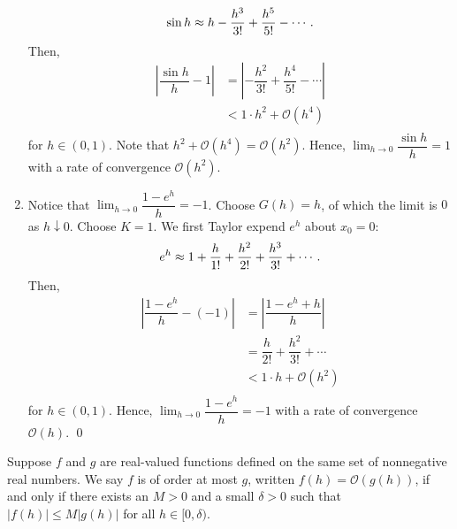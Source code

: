 \documentclass[11pt]{article}
\theoremstyle{break}
\numberwithin{equation}{theorem}
\begin{document}
\begin{enumerate}
    \begin{equation*}
        \sin h\approx h-\dfrac{h^3}{3!}+\dfrac{h^5}{5!}-\cdots. \vspace{-0.6em}
    \end{equation*}
    Then, \vspace{-0.6em}
    \begin{align*}
        \left\lvert \dfrac{\sin h}{h}-1\right\rvert&=\left\lvert -\dfrac{h^2}{3!}+\dfrac{h^4}{5!}-\cdots\right\rvert\\
        &<1\cdot h^2+\mathcal{O}(h^4)\\[-3.4em]
    \end{align*}
    for $h\in(0, 1)$. Note that $h^2+\mathcal{O}(h^4)=\mathcal{O}(h^2)$. Hence, $\displaystyle\lim_{h\to 0}\dfrac{\sin h}{h}=1$ with a rate of convergence $\mathcal{O}(h^2)$.
    \item Notice that $\displaystyle\lim_{h\to 0}\dfrac{1-e^h}{h}=-1$. Choose $G(h)=h$, of which the limit is $0$ as $h\downarrow 0$. Choose $K=1$. We first Taylor expend $e^h$ about $x_0=0$: \vspace{-0.6em}
    \begin{equation*}
        e^h\approx1+\dfrac{h}{1!}+\dfrac{h^2}{2!}+\dfrac{h^3}{3!}+\cdots. \vspace{-0.6em}
    \end{equation*}
    Then, \vspace{-0.6em}
    \begin{align*}
        \left\lvert \dfrac{1-e^h}{h}-(-1)\right\rvert&=\left\lvert \dfrac{1-e^h+h}{h}\right\rvert\\
        &=\dfrac{h}{2!}+\dfrac{h^2}{3!}+\cdots\\
        &<1\cdot h+\mathcal{O}(h^2)\\[-3.4em]
    \end{align*}
    for $h\in(0, 1)$. Hence, $\displaystyle\lim_{h\to 0}\dfrac{1-e^h}{h}=-1$ with a rate of convergence $\mathcal{O}(h)$. \qed
\end{enumerate}

\newpage
\setcounter{theorem}{0}
\renewcommand*{\thetheorem}{\Alph{theorem}}

\begin{definition}
    Suppose $f$ and $g$ are real-valued functions defined on the same set of nonnegative real numbers. We say $f$ is of order at most $g$, written $f(h)=\mathcal{O}(g(h))$, if and only if there exists an $M>0$ and a small $\delta>0$ such that $|f(h)|\leq M|g(h)|$ for all $h\in[0, \delta)$.
\end{definition}
\end{document}
